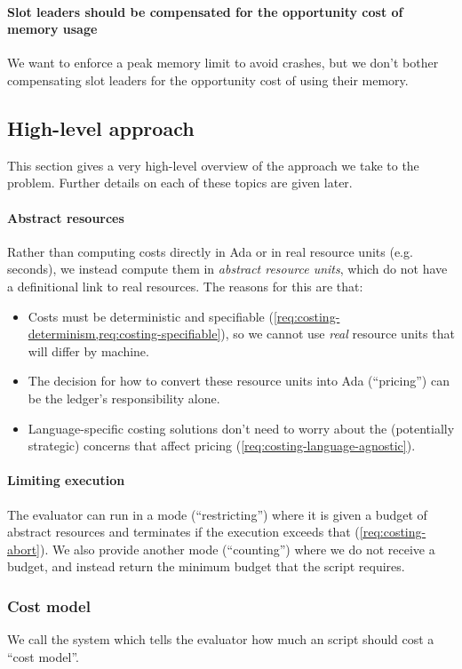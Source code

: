 \paragraph{Slot leaders should be compensated for the opportunity cost of memory usage}
We want to enforce a peak memory limit to avoid crashes, but we don't bother compensating slot leaders for the opportunity cost of using their memory.

\subsection{High-level approach}
This section gives a very high-level overview of the approach we take to the problem.
Further details on each of these topics are given later.

\paragraph{Abstract resources}
Rather than computing costs directly in Ada or in real resource units (e.g. seconds), we instead compute them in \emph{abstract resource units}, which do not have a definitional link to real resources.
The reasons for this are that:
\begin{itemize}
\item Costs must be deterministic and specifiable (\cref{req:costing-determinism,req:costing-specifiable}), so we cannot use \emph{real} resource units that will differ by machine.
\item The decision for how to convert these resource units into Ada (``pricing'') can be the ledger's responsibility alone.
\item Language-specific costing solutions don't need to worry about the (potentially strategic) concerns that affect pricing (\cref{req:costing-language-agnostic}).
\end{itemize}

\paragraph{Limiting execution}
The evaluator can run in a mode (``restricting'') where it is given a budget of abstract resources and terminates if the execution exceeds that (\cref{req:costing-abort}).
We also provide another mode (``counting'') where we do not receive a budget, and instead return the minimum budget that the script requires.

\subsubsection{Cost model}
We call the system which tells the evaluator how much an script should cost a ``cost model''.

